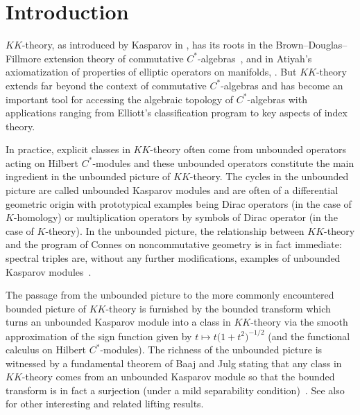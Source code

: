 \documentclass[pdftex]{sigma}
\numberwithin{equation}{section}
\begin{document}
\renewcommand{\thefootnote}{\arabic{footnote}}
\setcounter{footnote}{0}

\section{Introduction}
$KK$-theory, as introduced by Kasparov in \cite{Kas:TIE,Kas:OFE}, has its roots in the Brown--Douglas--Fillmore extension theory of commutative $C^*$-algebras~\cite{BDF:ECK}, and in Atiyah's axiomatization of properties of elliptic operators on manifolds, \cite{Ati:GEO}. But $KK$-theory extends far beyond the context of commutative $C^*$-algebras and has become an important tool for accessing the algebraic topology of $C^*$-algebras with applications ranging from Elliott's classification program to key aspects of index theory.

In practice, explicit classes in $KK$-theory often come from unbounded operators acting on Hilbert $C^*$-modules and these unbounded operators constitute the main ingredient in the unbounded picture of $KK$-theory. The cycles in the unbounded picture are called unbounded Kasparov modules and are often of a differential geometric origin with prototypical examples being Dirac operators (in the case of $K$-homology) or multiplication operators by symbols of Dirac operator (in the case of $K$-theory). In the unbounded picture, the relationship between $KK$-theory and the program of Connes on noncommutative geometry is in fact immediate: spectral triples are, without any further modifications, examples of unbounded Kasparov modules~\cite{Con:NCG,Con:GCM}.

The passage from the unbounded picture to the more commonly encountered bounded picture of $KK$-theory is furnished by the bounded transform which turns an unbounded Kasparov module into a class in $KK$-theory via the smooth approximation of the sign function given by $t \mapsto t\big(1 + t^2\big)^{-1/2}$ (and the functional calculus on Hilbert $C^*$-modules). The richness of the unbounded picture is witnessed by a fundamental theorem of Baaj and Julg stating that any class in $KK$-theory comes from an unbounded Kasparov module so that the bounded transform is in fact a surjection (under a mild separability condition)~\cite{BaJu:TBK}. See also \cite{Kuc:LIK,MeRe:NST} for other interesting and related lifting results.
\end{document}
